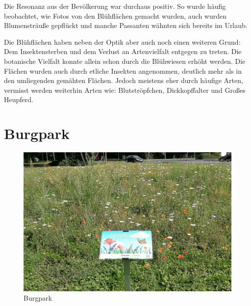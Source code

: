 \documentclass[10pt]{article}
\begin{document}
Die Resonanz aus der Bevölkerung war durchaus positiv. So wurde häufig beobachtet, wie Fotos von den Blühflächen gemacht wurden, auch wurden Blumensträuße gepflückt und manche Passanten wähnten sich bereits im Urlaub.

Die Blühflächen haben neben der Optik aber auch noch einen weiteren Grund: Dem Insektensterben und dem Verlust an Artenvielfalt entgegen zu treten. Die botanische Vielfalt konnte allein schon durch die Blühwiesen erhöht werden. Die Flächen wurden auch durch etliche Insekten angenommen, deutlich mehr als in den umliegenden gemähten Flächen. Jedoch meistens eher durch häufige Arten, vermisst werden weiterhin Arten wie: Blutströpfchen, Dickkopffalter und Großes Heupferd.


\newpage

\section{Burgpark}

\begin{figure}[h!]
  \includegraphics[width=\linewidth]{img/infotafeln.jpg}
  \caption{Burgpark}
  \label{fig:boat1}
\end{figure}
\end{document}
